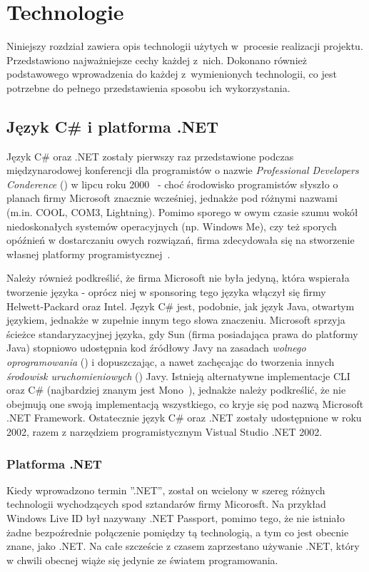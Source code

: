 \chapter{Technologie}\label{chap:technologie}

Niniejszy rozdział zawiera opis technologii użytych w~procesie realizacji projektu. Przedstawiono najważniejsze cechy każdej z~nich. Dokonano również podstawowego wprowadzenia do każdej z~wymienionych technologii, co jest potrzebne do pełnego przedstawienia sposobu ich wykorzystania.

\section{Język C\# i platforma .NET}\label{sec:cs}
Język C\# oraz .NET zostały pierwszy raz przedstawione podczas międzynarodowej konferencji dla programistów o nazwie \emph{Professional Developers Conderence} () w lipcu roku 2000~\cite{ms:initDotNet} - choć środowisko programistów słyszło o planach firmy Microsoft znacznie wcześniej, jednakże pod różnymi nazwami (m.in. COOL, COM3, Lightning). Pomimo sporego w owym czasie szumu wokół niedoskonałych systemów operacyjnych (np. Windows Me), czy też sporych opóźnień w dostarczaniu owych rozwiązań, firma zdecydowała się na stworzenie własnej platformy programistycznej~\cite{cSharp:inDepthF}.

Należy również podkreślić, że firma Microsoft nie była jedyną, która wspierała tworzenie języka - oprócz niej w sponsoring tego języka włączył się firmy Helwett-Packard oraz Intel. Język C\# jest, podobnie, jak język Java, otwartym językiem, jednakże w zupełnie innym tego słowa znaczeniu. Microsoft sprzyja ścieżce standaryzacyjnej języka, gdy Sun (firma posiadająca prawa do platformy Java) stopniowo udostępnia kod źródłowy Javy na zasadach \emph{wolnego oprogramowania} () i dopuszczając, a nawet zachęcając do tworzenia innych \emph{środowisk uruchomieniowych} () Javy. Istnieją alternatywne implementacje CLI oraz C\# (najbardziej znanym jest Mono~\cite{cs:mono}), jednakże należy podkreślić, że nie obejmują one swoją implementacją wszystkiego, co kryje się pod nazwą Microsoft .NET Framework. Ostatecznie język C\# oraz .NET zostały udostępnione w roku 2002, razem z narzędziem programistycznym Vistual Studio .NET 2002.

\subsection{Platforma .NET}
Kiedy wprowadzono termin ''.NET'', został on wcielony w szereg różnych technologii wychodzących spod sztandarów firmy Micorosft. Na przykład Windows Live ID był nazywany .NET Passport, pomimo tego, że nie istniało żadne bezpoźrednie połączenie pomiędzy tą technologią, a tym co jest obecnie znane, jako .NET. Na całe szczeście z czasem zaprzestano używanie .NET, który w chwili obecnej wiąże się jedynie ze światem programowania.

